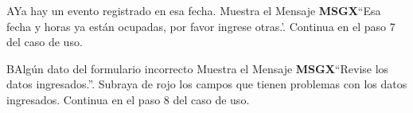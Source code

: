 		\begin{UCtrayectoriaA}{A}{Ya hay un evento registrado en esa fecha.}
			\UCpaso Muestra el Mensaje {\bf MSGX}``Esa fecha y horas ya están ocupadas, por favor ingrese otras.'.
			\UCpaso Continua en el paso 7 del caso de uso.
		\end{UCtrayectoriaA}
		\begin{UCtrayectoriaA}{B}{Algún dato del formulario incorrecto}
			\UCpaso Muestra el Mensaje {\bf MSGX}``Revise los datos ingresados.''.
                \UCpaso Subraya de rojo los campos que tienen problemas con los datos ingresados.
			\UCpaso Continua en el paso 8 del caso de uso.
		\end{UCtrayectoriaA}

